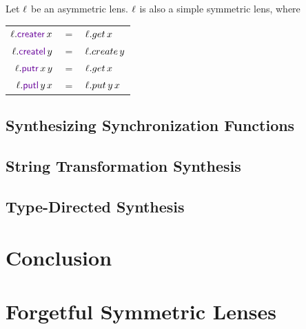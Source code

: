 \documentclass[acmsmall,screen,anonymous]{acmart}
\begin{document}
\begin{theorem}
  Let $\mathit{\ell}$ be an asymmetric lens. $\mathit{\ell}$ is also a simple symmetric lens,
  where
  \begin{center}
    \begin{tabular}{rcl}
      $\Lens.\CreateROf{x}$ & $=$ & $\mathit{\ell}.get \, x$\\
      $\Lens.\CreateLOf{y}$ & $=$ & $\mathit{\ell}.create \, y$\\
      $\Lens.\PutROf{x}{y}$ & $=$ & $\mathit{\ell}.get \, x$\\
      $\Lens.\PutLOf{y}{x}$ & $=$ & $\mathit{\ell}.put \, y \, x$
    \end{tabular}
  \end{center}
\end{theorem}

\subsection{Synthesizing Synchronization Functions}

\subsection{String Transformation Synthesis}

\subsection{Type-Directed Synthesis}


\section{Conclusion}
\label{sec:conc}

\begin{acks}
\end{acks}

\ifanon\else
\fi





\appendix

\ifappendices

\onecolumn

\section{Forgetful Symmetric Lenses}
\end{document}
